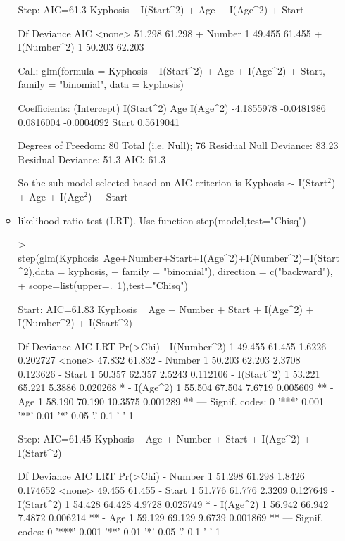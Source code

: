 \documentclass[a4paper]{article}
\begin{document}
\begin{itemize}
\begin{itemize}
\begin{Schunk}
\begin{Soutput}
Step:  AIC=61.3
Kyphosis ~ I(Start^2) + Age + I(Age^2) + Start

              Df Deviance    AIC
<none>             51.298 61.298
+ Number       1   49.455 61.455
+ I(Number^2)  1   50.203 62.203

Call:  glm(formula = Kyphosis ~ I(Start^2) + Age + I(Age^2) + Start, 
    family = "binomial", data = kyphosis)

Coefficients:
(Intercept)   I(Start^2)          Age     I(Age^2)  
 -4.1855978   -0.0481986    0.0816004   -0.0004092  
      Start  
  0.5619041  

Degrees of Freedom: 80 Total (i.e. Null);  76 Residual
Null Deviance:	    83.23 
Residual Deviance: 51.3 	AIC: 61.3
\end{Soutput}
\end{Schunk}
So the sub-model selected based on AIC criterion is Kyphosis $\sim$
I(Start$^2$) + Age + I(Age$^2$) + Start

\item likelihood ratio test (LRT). Use function step(model,test="Chisq")
\begin{Schunk}
\begin{Sinput}
> step(glm(Kyphosis~Age+Number+Start+I(Age^2)+I(Number^2)+I(Start^2),data = kyphosis,
+ 				family = "binomial"), direction = c("backward"),  
+ 				scope=list(upper=.~1),test="Chisq")	
\end{Sinput}
\begin{Soutput}
Start:  AIC=61.83
Kyphosis ~ Age + Number + Start + I(Age^2) + I(Number^2) + I(Start^2)

              Df Deviance    AIC     LRT Pr(>Chi)   
- I(Number^2)  1   49.455 61.455  1.6226 0.202727   
<none>             47.832 61.832                    
- Number       1   50.203 62.203  2.3708 0.123626   
- Start        1   50.357 62.357  2.5243 0.112106   
- I(Start^2)   1   53.221 65.221  5.3886 0.020268 * 
- I(Age^2)     1   55.504 67.504  7.6719 0.005609 **
- Age          1   58.190 70.190 10.3575 0.001289 **
---
Signif. codes:  0 '***' 0.001 '**' 0.01 '*' 0.05 '.' 0.1 ' ' 1

Step:  AIC=61.45
Kyphosis ~ Age + Number + Start + I(Age^2) + I(Start^2)

             Df Deviance    AIC    LRT Pr(>Chi)   
- Number      1   51.298 61.298 1.8426 0.174652   
<none>            49.455 61.455                   
- Start       1   51.776 61.776 2.3209 0.127649   
- I(Start^2)  1   54.428 64.428 4.9728 0.025749 * 
- I(Age^2)    1   56.942 66.942 7.4872 0.006214 **
- Age         1   59.129 69.129 9.6739 0.001869 **
---
Signif. codes:  0 '***' 0.001 '**' 0.01 '*' 0.05 '.' 0.1 ' ' 1


\end{Soutput}
\end{Schunk}
\end{itemize}
\end{itemize}
\end{document}
